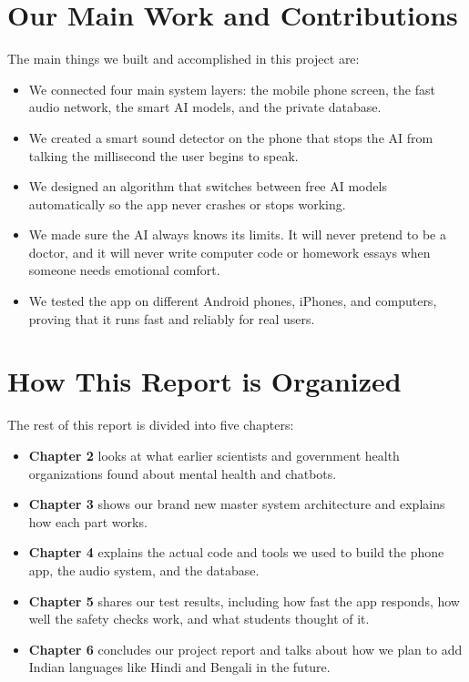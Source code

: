 \section{Our Main Work and Contributions}
\label{sec:intro_contributions}

The main things we built and accomplished in this project are:
\begin{itemize}
    \item We connected four main system layers: the mobile phone screen, the fast audio network, the smart AI models, and the private database.
    \item We created a smart sound detector on the phone that stops the AI from talking the millisecond the user begins to speak.
    \item We designed an algorithm that switches between free AI models automatically so the app never crashes or stops working.
    \item We made sure the AI always knows its limits. It will never pretend to be a doctor, and it will never write computer code or homework essays when someone needs emotional comfort.
    \item We tested the app on different Android phones, iPhones, and computers, proving that it runs fast and reliably for real users.
\end{itemize}

\section{How This Report is Organized}
\label{sec:intro_organization}

The rest of this report is divided into five chapters:
\begin{itemize}
    \item \textbf{Chapter 2} looks at what earlier scientists and government health organizations found about mental health and chatbots.
    \item \textbf{Chapter 3} shows our brand new master system architecture and explains how each part works.
    \item \textbf{Chapter 4} explains the actual code and tools we used to build the phone app, the audio system, and the database.
    \item \textbf{Chapter 5} shares our test results, including how fast the app responds, how well the safety checks work, and what students thought of it.
    \item \textbf{Chapter 6} concludes our project report and talks about how we plan to add Indian languages like Hindi and Bengali in the future.
\end{itemize}
